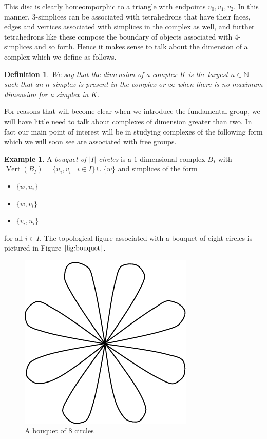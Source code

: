 \documentclass[12pt]{article}
\newtheorem{definition}{Definition}
\theoremstyle{definition}
\newtheorem{example}{Example}[section]
\numberwithin{equation}{theorem}
\begin{document}
This disc is clearly homeomporphic to a triangle with endpoints $v_0,v_1,v_2$. In this manner, $3$-simplices can be associated with tetrahedrons that have their faces, edges and vertices associated with simplices in the complex as well, and further tetrahedrons like these compose the boundary of objects associated with $4$-simplices and so forth. Hence it makes sense to talk about the dimension of a complex which we define as follows.

\begin{definition}
  We say that the \emph{dimension} of a complex $K$ is the largest  $n \in \mathbb{N}$ such that an $n$-simplex is present in the complex or $\infty$ when there is no maximum dimension for a simplex in $K$.
\end{definition}

For reasons that will become clear when we introduce the fundamental group, we will have little need to talk about complexes of dimension greater than two. In fact our main point of interest will be in studying complexes of the following form which we will soon see are associated with free groups.

\begin{example}
  \label{exmp:bouq}
  A \emph{bouquet of $|I|$ circles} is a $1$ dimensional complex $B_I$ with $\operatorname{Vert}(B_I) = \{u_i,v_i \mid i \in I \} \cup \{ w \}$ and simplices of the form
\begin{itemize}
\item $\{ w,u_i \}$
\item $\{ w, v_i \}$
\item $\{ v_i,u_i\}$
\end{itemize}
for all $i \in I$. The topological figure associated with a bouquet of eight circles is pictured in Figure $\ref{fig:bouquet}$.
\end{example}

\begin{figure}
  \centering
  \includegraphics[scale=0.4]{bouquet.png}
  \caption{A bouquet of 8 circles}
  \label{fig:bouquet}
\end{figure}
\end{document}
